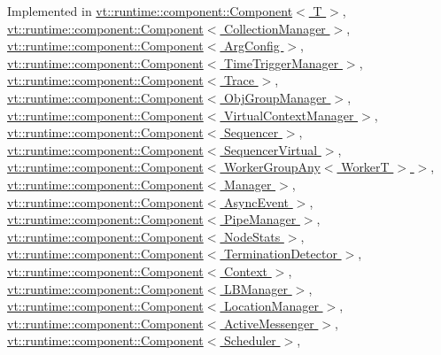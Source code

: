 Implemented in \hyperlink{structvt_1_1runtime_1_1component_1_1_component_adaf8bd995d4c91702e2ff7806ad9e695}{vt\+::runtime\+::component\+::\+Component$<$ T $>$}, \hyperlink{structvt_1_1runtime_1_1component_1_1_component_adaf8bd995d4c91702e2ff7806ad9e695}{vt\+::runtime\+::component\+::\+Component$<$ Collection\+Manager $>$}, \hyperlink{structvt_1_1runtime_1_1component_1_1_component_adaf8bd995d4c91702e2ff7806ad9e695}{vt\+::runtime\+::component\+::\+Component$<$ Arg\+Config $>$}, \hyperlink{structvt_1_1runtime_1_1component_1_1_component_adaf8bd995d4c91702e2ff7806ad9e695}{vt\+::runtime\+::component\+::\+Component$<$ Time\+Trigger\+Manager $>$}, \hyperlink{structvt_1_1runtime_1_1component_1_1_component_adaf8bd995d4c91702e2ff7806ad9e695}{vt\+::runtime\+::component\+::\+Component$<$ Trace $>$}, \hyperlink{structvt_1_1runtime_1_1component_1_1_component_adaf8bd995d4c91702e2ff7806ad9e695}{vt\+::runtime\+::component\+::\+Component$<$ Obj\+Group\+Manager $>$}, \hyperlink{structvt_1_1runtime_1_1component_1_1_component_adaf8bd995d4c91702e2ff7806ad9e695}{vt\+::runtime\+::component\+::\+Component$<$ Virtual\+Context\+Manager $>$}, \hyperlink{structvt_1_1runtime_1_1component_1_1_component_adaf8bd995d4c91702e2ff7806ad9e695}{vt\+::runtime\+::component\+::\+Component$<$ Sequencer $>$}, \hyperlink{structvt_1_1runtime_1_1component_1_1_component_adaf8bd995d4c91702e2ff7806ad9e695}{vt\+::runtime\+::component\+::\+Component$<$ Sequencer\+Virtual $>$}, \hyperlink{structvt_1_1runtime_1_1component_1_1_component_adaf8bd995d4c91702e2ff7806ad9e695}{vt\+::runtime\+::component\+::\+Component$<$ Worker\+Group\+Any$<$ Worker\+T $>$ $>$}, \hyperlink{structvt_1_1runtime_1_1component_1_1_component_adaf8bd995d4c91702e2ff7806ad9e695}{vt\+::runtime\+::component\+::\+Component$<$ Manager $>$}, \hyperlink{structvt_1_1runtime_1_1component_1_1_component_adaf8bd995d4c91702e2ff7806ad9e695}{vt\+::runtime\+::component\+::\+Component$<$ Async\+Event $>$}, \hyperlink{structvt_1_1runtime_1_1component_1_1_component_adaf8bd995d4c91702e2ff7806ad9e695}{vt\+::runtime\+::component\+::\+Component$<$ Pipe\+Manager $>$}, \hyperlink{structvt_1_1runtime_1_1component_1_1_component_adaf8bd995d4c91702e2ff7806ad9e695}{vt\+::runtime\+::component\+::\+Component$<$ Node\+Stats $>$}, \hyperlink{structvt_1_1runtime_1_1component_1_1_component_adaf8bd995d4c91702e2ff7806ad9e695}{vt\+::runtime\+::component\+::\+Component$<$ Termination\+Detector $>$}, \hyperlink{structvt_1_1runtime_1_1component_1_1_component_adaf8bd995d4c91702e2ff7806ad9e695}{vt\+::runtime\+::component\+::\+Component$<$ Context $>$}, \hyperlink{structvt_1_1runtime_1_1component_1_1_component_adaf8bd995d4c91702e2ff7806ad9e695}{vt\+::runtime\+::component\+::\+Component$<$ L\+B\+Manager $>$}, \hyperlink{structvt_1_1runtime_1_1component_1_1_component_adaf8bd995d4c91702e2ff7806ad9e695}{vt\+::runtime\+::component\+::\+Component$<$ Location\+Manager $>$}, \hyperlink{structvt_1_1runtime_1_1component_1_1_component_adaf8bd995d4c91702e2ff7806ad9e695}{vt\+::runtime\+::component\+::\+Component$<$ Active\+Messenger $>$}, \hyperlink{structvt_1_1runtime_1_1component_1_1_component_adaf8bd995d4c91702e2ff7806ad9e695}{vt\+::runtime\+::component\+::\+Component$<$ Scheduler $>$}, 